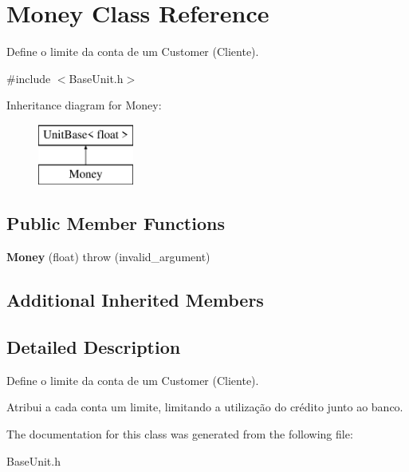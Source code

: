 \hypertarget{classMoney}{\section{Money Class Reference}
\label{classMoney}
}


Define o limite da conta de um Customer (Cliente).  




{\ttfamily \#include $<$Base\-Unit.\-h$>$}

Inheritance diagram for Money\-:\begin{figure}[H]
\begin{center}
\leavevmode
\includegraphics[height=2.000000cm]{classMoney}
\end{center}
\end{figure}
\subsection*{Public Member Functions}
\begin{DoxyCompactItemize}
\item 
\hypertarget{classMoney_a1b60c57dfd3140ad8c1ab4b831767ef0}{{\bfseries Money} (float)  throw (invalid\-\_\-argument)}\label{classMoney_a1b60c57dfd3140ad8c1ab4b831767ef0}

\end{DoxyCompactItemize}
\subsection*{Additional Inherited Members}


\subsection{Detailed Description}
Define o limite da conta de um Customer (Cliente). 

Atribui a cada conta um limite, limitando a utilização do crédito junto ao banco. 

The documentation for this class was generated from the following file\-:\begin{DoxyCompactItemize}
\item 
Base\-Unit.\-h\end{DoxyCompactItemize}
